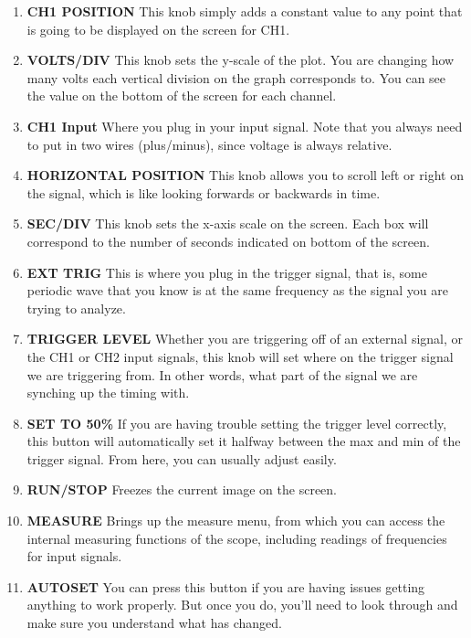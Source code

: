 \begin{enumerate}

\item \textbf{CH1 POSITION} This knob simply adds a constant value to any point that is going to be displayed on the screen for CH1.
\item \textbf{VOLTS/DIV} This knob sets the y-scale of the plot. You are changing how many volts each vertical division on the graph corresponds to. You can see the value on the bottom of the screen for each channel.
\item \textbf{CH1 Input}  Where you plug in your input signal. Note that you always need to put in two wires (plus/minus), since voltage is always relative.
\item \textbf{HORIZONTAL POSITION} This knob allows you to scroll left or right on the signal, which is like looking forwards or backwards in time.
\item \textbf{SEC/DIV} This knob sets the x-axis scale on the screen. Each box will correspond to the number of seconds indicated on bottom of the screen.
\item \textbf{EXT TRIG} This is where you plug in the trigger signal, that is, some periodic wave that you know is at the same frequency as the signal you are trying to analyze.
\item \textbf{TRIGGER LEVEL} Whether you are triggering off of an external signal, or the CH1 or CH2 input signals, this knob will set where on the trigger signal we are triggering from. In other words, what part of the signal we are synching up the timing with.
\item \textbf{SET TO 50\%} If you are having trouble setting the trigger level correctly, this button will automatically set it halfway between the max and min of the trigger signal. From here, you can usually adjust easily.
\item \textbf{RUN/STOP} Freezes the current image on the screen.
\item \textbf{MEASURE} Brings up the measure menu, from which you can access the internal measuring functions of the scope, including readings of frequencies for input signals.
\item \textbf{AUTOSET} You can press this button if you are having issues getting anything to work properly. But once you do, you'll need to look through and make sure you understand what has changed.
\end{enumerate}

